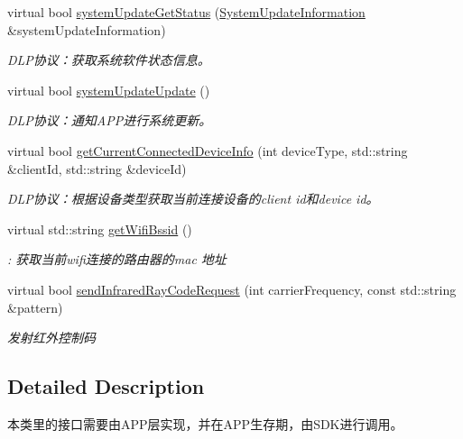 \begin{DoxyCompactItemize}
virtual bool \hyperlink{classduerOSDcsSDK_1_1sdkInterfaces_1_1ApplicationImplementation_aa1f6aab8cf3806120bce89da4f9447d6}{system\+Update\+Get\+Status} (\hyperlink{structduerOSDcsSDK_1_1sdkInterfaces_1_1SystemUpdateInformation}{System\+Update\+Information} \&system\+Update\+Information)
\begin{DoxyCompactList}\small\item\em D\+L\+P协议：获取系统软件状态信息。 \end{DoxyCompactList}\item 
virtual bool \hyperlink{classduerOSDcsSDK_1_1sdkInterfaces_1_1ApplicationImplementation_a644e2bfddb8d4a38fadc0acde7d568ac}{system\+Update\+Update} ()
\begin{DoxyCompactList}\small\item\em D\+L\+P协议：通知\+A\+P\+P进行系统更新。 \end{DoxyCompactList}\item 
virtual bool \hyperlink{classduerOSDcsSDK_1_1sdkInterfaces_1_1ApplicationImplementation_a8d12823ee272295a67796f6d39dcddae}{get\+Current\+Connected\+Device\+Info} (int device\+Type, std\+::string \&client\+Id, std\+::string \&device\+Id)
\begin{DoxyCompactList}\small\item\em D\+L\+P协议：根据设备类型获取当前连接设备的client id和device id。 \end{DoxyCompactList}\item 
virtual std\+::string \hyperlink{classduerOSDcsSDK_1_1sdkInterfaces_1_1ApplicationImplementation_a2f38ee5cb10328c1dde10c8940dd4e8c}{get\+Wifi\+Bssid} ()
\begin{DoxyCompactList}\small\item\em \+: 获取当前wifi连接的路由器的mac 地址 \end{DoxyCompactList}\item 
virtual bool \hyperlink{classduerOSDcsSDK_1_1sdkInterfaces_1_1ApplicationImplementation_a852302b46fca3524968580092a9ff5e3}{send\+Infrared\+Ray\+Code\+Request} (int carrier\+Frequency, const std\+::string \&pattern)
\begin{DoxyCompactList}\small\item\em 发射红外控制码 \end{DoxyCompactList}\end{DoxyCompactItemize}


\subsection{Detailed Description}
本类里的接口需要由\+A\+P\+P层实现，并在\+A\+P\+P生存期，由\+S\+D\+K进行调用。 

